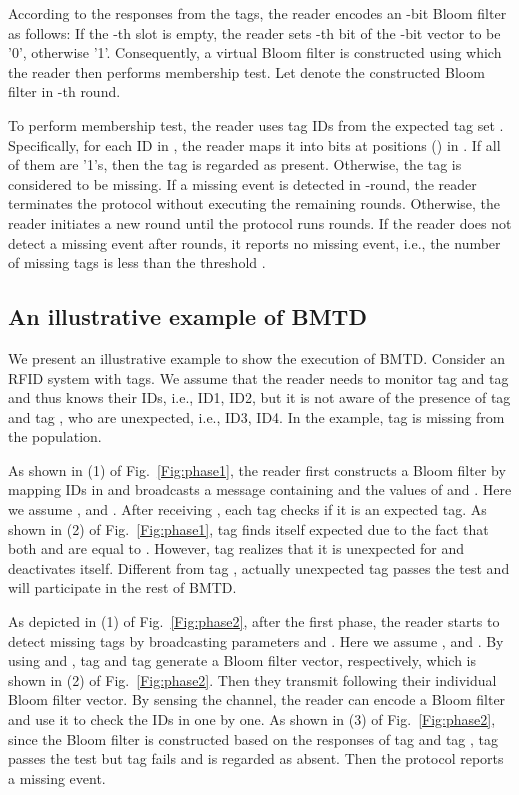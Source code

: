 \documentclass[10pt, twocolumn]{IEEEtran}
\begin{document}
According to the responses from the tags, the reader encodes an -bit Bloom filter as follows: If the -th slot is empty, the reader sets -th bit of the -bit vector to be '0', otherwise '1'. Consequently, a virtual Bloom filter is constructed using which the reader then performs membership test. Let  denote the constructed Bloom filter in -th round.

To perform membership test, the reader uses tag IDs from the expected tag set . Specifically, for each ID in , the reader maps it into  bits at positions  () in . If all of them are '1's, then the tag is regarded as present. Otherwise, the tag is considered to be missing. If a missing event is detected in -round, the reader terminates the protocol without executing the remaining rounds. Otherwise, the reader initiates a new round until the protocol runs  rounds. If the reader does not detect a missing event after  rounds, it reports no missing event, i.e., the number of missing tags  is less than the threshold .


\subsection{An illustrative example of BMTD}
We present an illustrative example to show the execution of BMTD. Consider an RFID system with  tags. We assume that the reader needs to monitor tag  and tag  and thus knows their IDs, i.e., ID1, ID2, but it is not aware of the presence of tag  and tag , who are unexpected, i.e., ID3, ID4. In the example, tag  is missing from the population.

As shown in (1) of Fig.~\ref{Fig:phase1}, the reader first constructs a Bloom filter  by mapping IDs in  and broadcasts a message containing  and the values of  and . Here we assume ,  and . After receiving , each tag checks if it is an expected tag. As shown in (2) of Fig.~\ref{Fig:phase1}, tag  finds itself expected due to the fact that both  and  are equal to . However, tag  realizes that it is unexpected for  and deactivates itself. Different from tag , actually unexpected tag  passes the test and will participate in the rest of BMTD.

As depicted in (1) of Fig.~\ref{Fig:phase2}, after the first phase, the reader starts to detect missing tags by broadcasting parameters  and . Here we assume ,  and . By using  and , tag  and tag  generate a Bloom filter vector, respectively, which is shown in (2) of Fig.~\ref{Fig:phase2}. Then they transmit following their individual Bloom filter vector. By sensing the channel, the reader can encode a Bloom filter and use it to check the IDs in  one by one. As shown in (3) of Fig.~\ref{Fig:phase2}, since the Bloom filter is constructed based on the responses of tag  and tag , tag  passes the test but tag  fails and is regarded as absent. Then the protocol reports a missing event.
\end{document}
